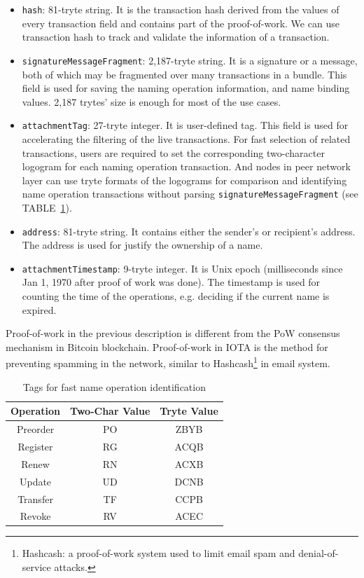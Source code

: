 \begin{itemize}
    \item \texttt{hash}: 81-tryte string. It is the transaction hash derived from the values of every transaction field and contains part of the proof-of-work. We can use transaction hash to track and validate the information of a transaction.
    \item \texttt{signatureMessageFragment}: 2,187-tryte string. It is a signature or a message, both of which may be fragmented over many transactions in a bundle.
          This field is used for saving the naming operation information, and name binding values. 2,187 trytes' size is enough for most of the use cases.
    \item \texttt{attachmentTag}: 27-tryte integer. It is user-defined tag. This field is used for accelerating the filtering of the live transactions.
          For fast selection of related transactions, users are required to set the corresponding two-character logogram for each naming operation transaction.
          And nodes in peer network layer can use tryte formats of the logograms for comparison and identifying name operation transactions without parsing \texttt{signatureMessageFragment} (see TABLE~\ref{table:tags}).
    \item \texttt{address}: 81-tryte string. It contains either the sender's or recipient's address. The address is used for justify the ownership of a name.
    \item \texttt{attachmentTimestamp}: 9-tryte integer. It is Unix epoch (milliseconds since Jan 1, 1970 after proof of work was done). The timestamp is used for counting the time of the operations, e.g. deciding if the current name is expired.
\end{itemize}

Proof-of-work in the previous description is different from the PoW consensus mechanism in Bitcoin blockchain.
Proof-of-work in IOTA is the method for preventing spamming in the network, similar to Hashcash\footnote{Hashcash: a proof-of-work system used to limit email spam and denial-of-service attacks.} in email system.

\begin{table}[h]
    \centering
    \begin{tabular}{||c c c||}
        \hline
        Operation & Two-Char Value & Tryte Value \\ [0.5ex]
        \hline\hline
        Preorder  & PO             & ZBYB        \\
        Register  & RG             & ACQB        \\
        Renew     & RN             & ACXB        \\
        Update    & UD             & DCNB        \\
        Transfer  & TF             & CCPB        \\
        Revoke    & RV             & ACEC        \\ [1ex]
        \hline
    \end{tabular}
    \caption{Tags for fast name operation identification}
    \label{table:tags}
\end{table}


